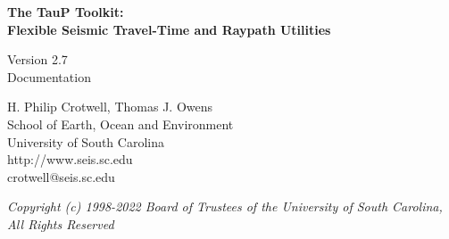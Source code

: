 
\begin{titlepage}
\begin{center}

\vspace{2in}

\LARGE
\textbf{
The TauP Toolkit: \\
Flexible Seismic Travel-Time and Raypath Utilities \\
}

\large
Version 2.7 \\
Documentation

\vspace{3in}

H. Philip Crotwell, Thomas J. Owens \\
School of Earth, Ocean and Environment \\
University of South Carolina \\
http://www.seis.sc.edu \\
crotwell@seis.sc.edu

\vspace{3in}

\textit{
\normalsize
Copyright (c) 1998-2022 Board of Trustees of the University of South Carolina, \\
All Rights Reserved
\normalsize}

\end{center}
\end{titlepage}
